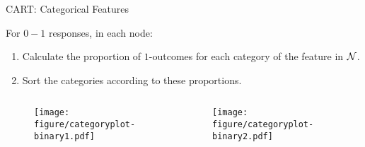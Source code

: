 \documentclass[11pt,compress,t,notes=noshow, xcolor=table]{beamer}
\begin{document}
  \begin{frame}[noframenumbering]{CART: Categorical Features}

For $0-1$ responses, in each node:
  \begin{enumerate}
  \item Calculate the proportion of $1$-outcomes for each category of the feature in $\mathcal{N}$.
  \item Sort the categories according to these proportions.
  \end{enumerate}
  \begin{columns}
  \begin{column}{0.33\textwidth}
  \begin{figure}
  \texttt{[image: figure/categoryplot-binary1.pdf]} 
  \end{figure}
  \end{column}
  \begin{column}{0.33\textwidth}
  \begin{figure}
  \texttt{[image: figure/categoryplot-binary2.pdf]} 
  \end{figure}
  \end{column}
  \begin{column}{0.33\textwidth}
  \end{column}
  \end{columns}

\end{frame}
\end{document}
